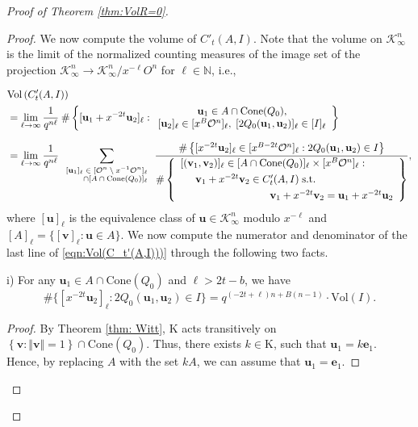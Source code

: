 \documentclass[11pt,a4paper,reqno]{amsart}
\def\N{\mathbb{N}}
\def\vol{\mathrm{Vol}}
\newcommand{\Cone}{\mathrm{Cone}}
\theoremstyle{definition}
\theoremstyle{remark}
\numberwithin{equation}{section}
\begin{document}
\begin{proof}[Proof of Theorem \ref{thm:VolR=0}]
\begin{proof}
\noindent We now compute the volume of $C'_t(A,I)$. Note that the volume on $\mathcal K_\infty^n$ is the limit of the normalized counting measures of the image set of the projection $\mathcal K_\infty^n \rightarrow \mathcal K_\infty^n/ x^{-\ell}O^n$ for $\ell\in \N$, i.e.,

\begin{equation}
\begin{split}\label{eqn:Vol(C_t'(A,I)))}
&\vol\left(C'_t(A,I)\right)\\
&=\lim_{\ell\rightarrow \infty} \frac 1 {q^{n\ell}} \:
 \#\left\{[\mathbf u_1 + x^{-2t} \mathbf u_2]_\ell: 
 \begin{array}{c}
 \mathbf u_1\in A\cap \Cone(Q_0),\\
 {[\mathbf{u}_2]_{\ell}\in [x^B\mathcal{O}^n]_{\ell}},\; [2Q_0(\mathbf u_1, \mathbf u_2)]_{\ell}\in [I]_{\ell}\end{array}
 \right\}\\[0.1in]
 &=\lim_{\ell\rightarrow \infty} \frac 1 {q^{n\ell}}
\sum_{\scriptsize\begin{array}{r}
[\mathbf{u}_1]_{\ell}\in [\mathcal{O}^n\setminus x^{-1}\mathcal{O}^n]_{\ell}\\
\cap [A\cap \operatorname{Cone}(Q_0)]_{\ell}\end{array}}
\frac{\# 
 \left\{[x^{-2t}\mathbf u_2]_\ell\in [x^{B-2t}\mathcal{O}^n]_{\ell}: 2Q_0(\mathbf u_1, \mathbf u_2)\in I \right\}
}{\# 
    \left\{\begin{array}{l}[(\mathbf{v}_1,\mathbf{v}_2)]_{\ell}\in [A\cap \operatorname{Cone}(Q_0)]_{\ell}\times [x^B\mathcal{O}^n]_{\ell}: \\[0.05in]
\hspace{0.2in}\mathbf v_1+x^{-2t}\mathbf v_2\in C'_t(A,I)\;\text{s.t.}\\[0.05in]
\hspace{1.2in}\mathbf v_1+x^{-2t}\mathbf v_2=\mathbf u_1+x^{-2t}\mathbf u_2\end{array}\right\}
},
\end{split}\end{equation}
where $[\mathbf u]_\ell$ is the equivalence class of $\mathbf u\in \mathcal K_\infty^n $ modulo $x^{-\ell}$ and $[A]_{\ell}=\{[\mathbf v]_\ell: \mathbf u\in A\}$. We now compute the numerator and denominator of the last line of \eqref{eqn:Vol(C_t'(A,I)))} through the following two facts.

\vspace{0.1in}
\noindent i) For any $\mathbf u_1\in A\cap \Cone(Q_0)$ and $\ell>2t-b$, we have 
\[
\#\{[x^{-2t}\mathbf u_2]_\ell: 2Q_0( \mathbf u_1, \mathbf u_2)\in I\}=q^{(-2t+\ell)n+B(n-1)}\cdot \vol(I).
\] 
\begin{proof}
By Theorem \ref{thm: Witt}, $\mathrm{K}$ acts transitively on $\left\{\mathbf{v}:\Vert \mathbf{v}\Vert=1\right\}\cap \Cone(Q_0)$. Thus, there exists $k\in \mathrm{K}$, such that $\mathbf{u}_1=k\mathbf{e}_1$. Hence, by replacing $A$ with the set $kA$,  we can assume that $\mathbf u_1=\mathbf e_1$. 


\end{proof}
\end{proof}
\end{proof}
\end{document}
